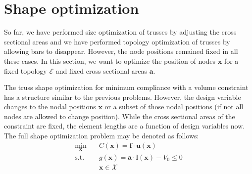 \section{Shape optimization}
So far, we have performed size optimization of trusses by adjusting the cross sectional areas and we have performed topology optimization of trusses by allowing bars to disappear. However, the node positions remained fixed in all these cases. 
In this section, we want to optimize the position of nodes $\mathbf{x}$ for a fixed topology $\mathcal{E}$ and fixed cross sectional areas $\mathbf{a}$.

The truss shape optimization for minimum compliance with a volume constraint has a structure similar to the previous problems. However, the design variable changes to the nodal positions $\mathbf{x}$ or a subset of those nodal positions (if not all nodes are allowed to change position). While the cross sectional areas of the constraint are fixed, the element lengths are a function of design variables now. The full shape optimization problem may be denoted as follows:
\begin{equation}
    \begin{aligned}
        \min_{\mathbf{x}} \quad & C(\mathbf{x}) = \mathbf{f} \cdot \mathbf{u}(\mathbf{x})\\
        \textrm{s.t.} \quad & g(\mathbf{x}) = \mathbf{a} \cdot \mathbf{l}(\mathbf{x}) - V_0 \le 0  \\
                            & \mathbf{x} \in \mathcal{X}\\
    \end{aligned}
    \label{eq:shape_optimization}
\end{equation}

